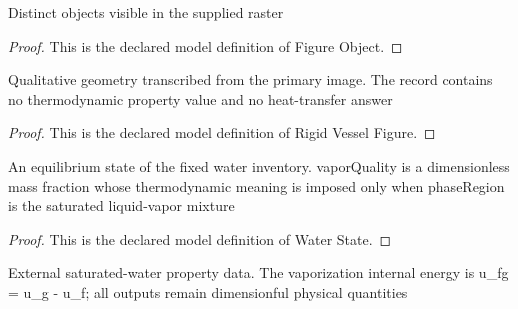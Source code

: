 \begin{definition}
  \label{def:physics:phyx-mini-0451:phyxminiproblems-problemphyxmini0451-figureobject}
  Distinct objects visible in the supplied raster
\end{definition}
\begin{proof}
  This is the declared model definition of Figure Object.
\end{proof}
\begin{definition}
  \label{def:physics:phyx-mini-0451:phyxminiproblems-problemphyxmini0451-rigidvesselfigure}
  Qualitative geometry transcribed from the primary image. The record contains no thermodynamic property value and no heat-transfer answer
\end{definition}
\begin{proof}
  This is the declared model definition of Rigid Vessel Figure.
\end{proof}
\begin{definition}
  \label{def:physics:phyx-mini-0451:phyxminiproblems-problemphyxmini0451-waterstate}
  An equilibrium state of the fixed water inventory. vaporQuality is a dimensionless mass fraction whose thermodynamic meaning is imposed only when phaseRegion is the saturated liquid-vapor mixture
\end{definition}
\begin{proof}
  This is the declared model definition of Water State.
\end{proof}
\begin{definition}
  \label{def:physics:phyx-mini-0451:phyxminiproblems-problemphyxmini0451-saturatedwatertable}
  External saturated-water property data. The vaporization internal energy is u\_fg = u\_g - u\_f; all outputs remain dimensionful physical quantities
\end{definition}
